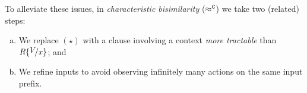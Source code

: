 To alleviate these issues,
in %
\emph{characteristic
bisimilarity} ($\approx^\mathtt{C}$)
we take two (related) steps: 
\begin{enumerate}[(a)]
	\item We replace $(\star)$ with a clause involving a context \emph{more tractable} than $R\subst{V}{x}$; and 
	\item We refine  inputs %
	to avoid observing infinitely many actions on the same input prefix.
\end{enumerate}


\begin{comment}
\myparagraph{Issues of Context Bisimilarity.}
Context bisimilarity ($\wbc$, \defref{def:wbc}) is an overly demanding relation on higher-order processes. 
This issue may be better appreciated by examining the output clause of context bisimilarity.
Suppose $P \,\Re\, Q$, for some context bisimulation $\Re$. Then:
\begin{enumerate}[$(\star)$]
	\item	Whenever 
		$P \by{\news{\widetilde{m_1}} \bactout{n}{V}} P'$
		there exist
		$Q'$ and $W$
		such that 
		$Q \by{\news{\widetilde{m_2}} \bactout{n}{W}} Q'$
		and, \emph{\textbf{for all} $R$}  with $\fv{R}=x$, 
		$\newsp{\widetilde{m_1}}{P' \Par R\subst{V}{x}} \,\Re\, \newsp{\widetilde{m_2}}{Q' \Par R\subst{W}{x}}$.
\end{enumerate}
\smallskip 
\noi 
Above, 
$\news{\widetilde{m_1}} \bactout{n}{V}$ is the output label of 
value $V$ with extrusion of names in $\widetilde{m_1}$.
To reduce the burden induced by 
universal quantification, we introduce 
\emph{characteristic}  
bisimilarity ($\fwb$). %
As we work with an \emph{early} labelled transition system (LTS), 
%
we take the following two steps: 
%
\begin{enumerate}[(a)]
	\item replace $(\star)$ with a clause involving a more tractable process closure; and 
	\item refine the input LTS rule 
	to avoid observing infinitely many actions on the same input prefix.
\end{enumerate}
%
\end{comment}


